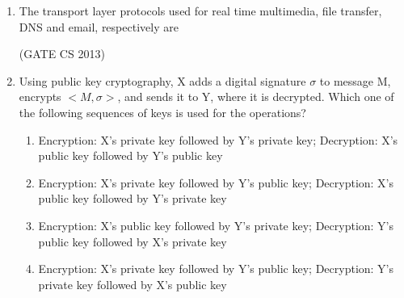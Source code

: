 \documentclass[a4paper, 11pt]{article}
\begin{document}
\begin{enumerate}
\begin{center}
\begin{multicols}{2}
    \noindent\textbf{\underline{GROUP II}}
    \begin{enumerate}[label=(\arabic*)]
        \item Interoperability
        \item BPMN
        \item Publish-find-bind
        \item XML
    \end{enumerate}
    \end{multicols}
    \end{center}
    \begin{enumerate}
    \end{enumerate}
    \hfill (GATE CS 2013)
    \item The transport layer protocols used for real time multimedia, file transfer, DNS and email, respectively are
    \begin{enumerate}
    \end{enumerate}

    \hfill (GATE CS 2013)
    
    \item Using public key cryptography, X adds a digital signature $\sigma$ to message M, encrypts $<M, \sigma>$, and sends it to Y, where it is decrypted. Which one of the following sequences of keys is used for the operations? 
    \begin{enumerate}
        \item  Encryption: X’s private key followed by Y’s private key; Decryption: X’s public key followed by Y’s public key
        \item Encryption: X’s private key followed by Y’s public key; Decryption: X’s public key followed by Y’s private key
        \item Encryption: X’s public key followed by Y’s private key; Decryption: Y’s public key followed by X’s private key
        \item Encryption: X’s private key followed by Y’s public key; Decryption: Y’s private key followed by X’s public key
    \end{enumerate}


\end{enumerate}
\end{document}
